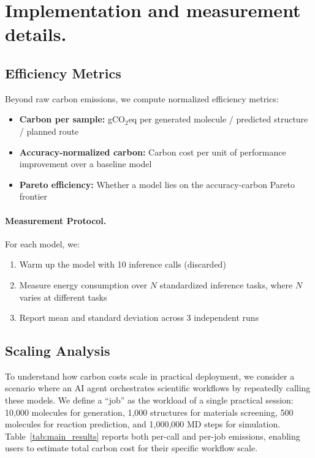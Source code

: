 \documentclass{article}
\theoremstyle{plain}
\theoremstyle{definition}
\theoremstyle{remark}
\begin{document}
\section{Implementation and measurement details.}
\subsection{Efficiency Metrics}

Beyond raw carbon emissions, we compute normalized efficiency metrics:

\begin{itemize}
    \item \textbf{Carbon per sample:} gCO$_2$eq per generated molecule / predicted structure / planned route
    \item \textbf{Accuracy-normalized carbon:} Carbon cost per unit of performance improvement over a baseline model
    \item \textbf{Pareto efficiency:} Whether a model lies on the accuracy-carbon Pareto frontier
\end{itemize}

\paragraph{Measurement Protocol.}
For each model, we:
\begin{enumerate}
    \item Warm up the model with 10 inference calls (discarded)
    \item Measure energy consumption over $N$ standardized inference tasks, where $N$ varies at different tasks
    \item Report mean and standard deviation across 3 independent runs
\end{enumerate}

\subsection{Scaling Analysis}

To understand how carbon costs scale in practical deployment, we consider a scenario where an AI agent orchestrates scientific workflows by repeatedly calling these models. We define a ``job'' as the workload of a single practical session: 10{,}000 molecules for generation, 1{,}000 structures for materials screening, 500 molecules for reaction prediction, and 1{,}000{,}000 MD steps for simulation. Table~\ref{tab:main_results} reports both per-call and per-job emissions, enabling users to estimate total carbon cost for their specific workflow scale.
\end{document}
